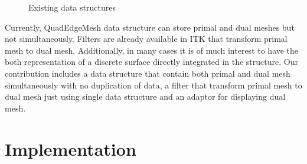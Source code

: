 \documentclass{InsightArticle}
\begin{document}
\begin{figure}
	\centering
	\caption{Existing data structures}
	\label{fig:QuadEdgeMeshStructure}
\end{figure}

Currently, QuadEdgeMesh data structure can store primal and dual meshes but not simultaneously. Filters are already available in ITK that transform primal mesh to dual mesh. Additionally, in many cases it is of much interest to have the both representation of a discrete surface directly integrated in the structure. Our contribution includes a data structure that contain both primal and dual mesh simultaneously with no duplication of data, a filter that transform primal mesh to dual mesh just using single data structure and an adaptor for displaying dual mesh.

\section{Implementation}

\end{document}
